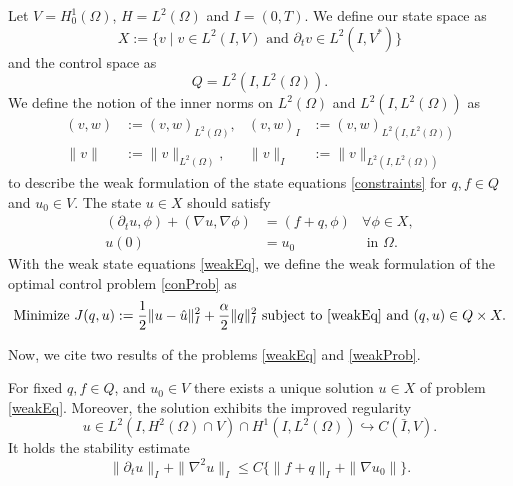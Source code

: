 Let $V=H_0^1(\Omega)$, $H=L^2(\Omega)$ and $I=(0,T)$. We define our state space as
\begin{displaymath}
X:=\{v\mid v\in L^2(I,V)\text{ and }\partial_tv\in L^2(I,V^*)\}
\end{displaymath}
and the control space as
\begin{displaymath}
Q=L^2(I,L^2(\Omega)).
\end{displaymath}
We define the notion of the inner norms on $L^2(\Omega)$ and $L^2(I,L^2(\Omega))$ as
\begin{align*}
(v,w)&:=(v,w)_{L^2(\Omega)},&(v,w)_I&:=(v,w)_{L^2(I,L^2(\Omega))}\\
\|v\|&:=\|v\|_{L^2(\Omega)},&\|v\|_I&:=\|v\|_{L^2(I,L^2(\Omega))}
\end{align*}
to describe the weak formulation of the state equations \eqref{constraints} for $q,f\in Q$ and $u_0\in V$. The state $u\in X$ should satisfy
\begin{equation}
\label{weakEq}
\begin{aligned}
	(\partial_tu,\phi)+(\nabla u,\nabla\phi)&=(f+q,\phi)&\forall\phi\in X,\\
	u(0)&=u_0&\text{ in }\Omega.
\end{aligned}
\end{equation}
With the weak state equations \eqref{weakEq}, we define the weak formulation of the optimal control problem \eqref{conProb} as
\begin{equation}
\label{weakProb}
\text{Minimize }J(q,u):=\frac{1}{2}\|u-\hat{u}\|_I^2+\frac{\alpha}{2}\|q\|_I^2\text{ subject to \eqref{weakEq} and }(q,u)\in Q\times X.
\end{equation}

Now, we cite two results of the problems \eqref{weakEq} and \eqref{weakProb}.

\begin{prop}
\label{uniqueU}
For fixed $q,f\in Q$, and $u_0\in V$ there exists a unique solution $u\in X$ of problem \eqref{weakEq}. Moreover, the solution exhibits the improved regularity
\begin{displaymath}
u\in L^2(I,H^2(\Omega)\cap V)\cap H^1(I,L^2(\Omega))\hookrightarrow C(\bar{I},V).
\end{displaymath}
It holds the stability estimate
\begin{displaymath}
\|\partial_tu\|_I+\|\nabla^2u\|_I\leq C\{\|f+q\|_I+\|\nabla u_0\|\}.
\end{displaymath}
\end{prop}

